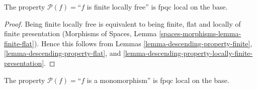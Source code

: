 \begin{lemma}
\label{lemma-descending-property-finite-locally-free}
The property $\mathcal{P}(f) =$``$f$ is finite locally free''
is fpqc local on the base.
\end{lemma}

\begin{proof}
Being finite locally free is equivalent to being
finite, flat and locally of finite presentation
(Morphisms of Spaces, Lemma \ref{spaces-morphisms-lemma-finite-flat}).
Hence this follows from Lemmas
\ref{lemma-descending-property-finite},
\ref{lemma-descending-property-flat}, and
\ref{lemma-descending-property-locally-finite-presentation}.
\end{proof}

\begin{lemma}
\label{lemma-descending-property-monomorphism}
The property $\mathcal{P}(f) =$``$f$ is a monomorphism''
is fpqc local on the base.
\end{lemma}

